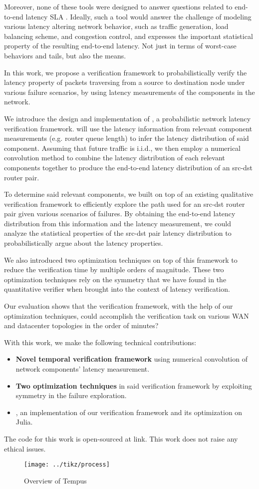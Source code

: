 Moreover, none of these tools were designed to answer questions related to end-to-end latency SLA \cite{Verizon}.
Ideally, such a tool would answer the challenge of modeling various latency altering network behavior, 
such as traffic generation, load balancing scheme, and congestion control, and expresses the important 
statistical property of the resulting end-to-end latency.
Not just in terms of worst-case behaviors and tails, but also the means.

In this work, we propose a verification framework to probabilistically verify the latency property of packets 
traversing from a source to destination node under various failure scenarios, by using latency 
measurements of the components in the network.

We introduce the design and implementation of \tool, a probabilistic network latency verification 
framework.
\tool will use the latency information from relevant component measurements (e.g. router queue length) 
to infer the latency distribution of said component.
Assuming that future traffic is i.i.d., we then employ a numerical convolution method to combine the
latency distribution of each relevant components together to produce the end-to-end latency distribution 
of an src-dst router pair. 

To determine said relevant components, we built \tool on top of an existing qualitative verification 
framework to efficiently explore the path used for an src-dst router pair given various scenarios of 
failures.
By obtaining the end-to-end latency distribution from this information and the latency measurement, 
we could analyze the statistical properties of the src-dst pair latency distribution to probabilistically 
argue about the latency properties.

We also introduced two optimization techniques on top of this framework to reduce the verification time 
by multiple orders of magnitude.
These two optimization techniques rely on the symmetry that we have found in the quantitative verifier 
when brought into the context of latency verification.

Our evaluation shows that the verification framework, with the help of our optimization techniques, 
could accomplish the verification task on various WAN and datacenter topologies in the order of 
minutes?

With this work, we make the following technical contributions:
\begin{itemize}
    \item \textbf{Novel temporal verification framework} using numerical convolution of network 
        components' latency measurement.
    \item \textbf{Two optimization techniques} in said verification framework by exploiting 
        symmetry in the failure exploration.
    \item \textbf{\tool}, an implementation of our verification framework and its optimization 
        on Julia.
\end{itemize}

The code for this work is open-sourced at link. %
This work does not raise any ethical issues.

\begin{figure*}[h]
    \centering
    \texttt{[image: ../tikz/process]}
    \caption{Overview of Tempus}
    \label{fig:process}
\end{figure*}